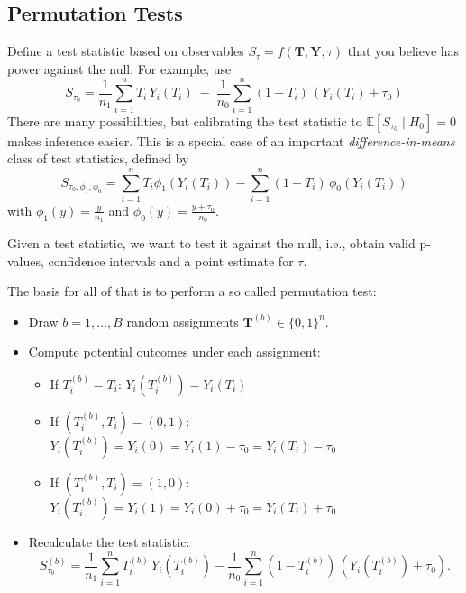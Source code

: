 \documentclass[11pt]{exam}
\theoremstyle{plain}
\newcommand{\E}{\mathbb{E}}
\newcommand{\bY}{\bm{Y}}
\newcommand{\bT}{\bm{T}}
\begin{document}
\subsection{Permutation Tests}
Define a test statistic based on observables $S_\tau = f(\bT, \bY, \tau)$ that you believe has power against the null. For example, use
\[
    S_{\tau_0}=\frac{1}{n_1}\sum_{i=1}^n T_i\,Y_i(T_i)\;-\;\frac{1}{n_0}\sum_{i=1}^n (1-T_i)\,(Y_i(T_i) + \tau_0)
\]
There are many possibilities, but calibrating the test statistic to $\E[S_{\tau_0} \mid H_0] = 0$ makes inference easier. This is a special case of an important \emph{difference-in-means} class of test statistics, defined by
\[
    S_{\tau_0, \phi_1, \phi_0}= \sum_{i=1}^n T_i \phi_1(Y_i(T_i)) - \sum_{i=1}^n (1-T_i)\,\phi_0(Y_i(T_i))
\]
with $\phi_1(y) = \frac{y}{n_1}$ and $\phi_0(y) = \frac{y + \tau_0}{n_0}$.

Given a test statistic, we want to test it against the null, i.e., obtain valid p-values, confidence intervals and a point estimate for $\tau$.

The basis for all of that is to perform a so called permutation test:
\begin{itemize}
  \item Draw $b = 1,\ldots,B$ random assignments $\bm{T}^{(b)} \in \{0,1\}^n$.
  \item Compute potential outcomes under each assignment:
  \begin{itemize}
    \item If $T_i^{(b)} = T_i$: $Y_i(T_i^{(b)}) = Y_i(T_i)$
    \item If $(T_i^{(b)}, T_i) = (0,1)$: $Y_i(T_i^{(b)}) = Y_i(0) = Y_i(1) - \tau_0 = Y_i(T_i) - \tau_0$
    \item If $(T_i^{(b)}, T_i) = (1,0)$: $Y_i(T_i^{(b)}) = Y_i(1) = Y_i(0) + \tau_0 = Y_i(T_i) + \tau_0$
  \end{itemize}
  \item Recalculate the test statistic:
  \[
  S_{\tau_0}^{(b)} = 
  \frac{1}{n_1}\sum_{i=1}^n T_i^{(b)}\,Y_i(T_i^{(b)})
  - 
  \frac{1}{n_0}\sum_{i=1}^n (1-T_i^{(b)})\,(Y_i(T_i^{(b)}) + \tau_0).
  \]
\end{itemize}
\end{document}
